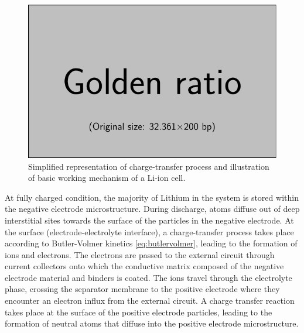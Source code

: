 \begin{figure}[!htbp]
    \centering
    \includegraphics{placeholder_images/example-image-golden.pdf}
    \caption[Charge-transer and basic working mechanism of a Li-ion cell]{Simplified representation of charge-transfer
    process and illustration of basic working mechanism of a Li-ion cell.}
    \label{fig:chargetransferprocess}
\end{figure}

At fully  charged condition,  the majority  of Lithium in  the system  is stored
within  the  negative  electrode  microstructure.  During  discharge,  
atoms  diffuse  out of  deep  interstitial  sites  towards  the surface  of  the
particles  in  the negative  electrode.  At  the surface  (electrode-electrolyte
interface),  a charge-transfer  process takes  place according  to Butler-Volmer
kinetics \cref{eq:butlervolmer}, leading to the  formation of  ions and
electrons.  The electrons  are passed  to the  external circuit  through 
current collectors  onto which  the conductive matrix  composed of  the negative
electrode material and binders is coated.  The  ions travel through the
electrolyte phase,  crossing the  separator membrane  to the  positive electrode
where they  encounter an  electron influx  from the  external circuit.  A charge
transfer  reaction  takes  place  at  the  surface  of  the  positive  electrode
particles, leading to the formation of neutral  atoms that diffuse into
the positive electrode microstructure.

